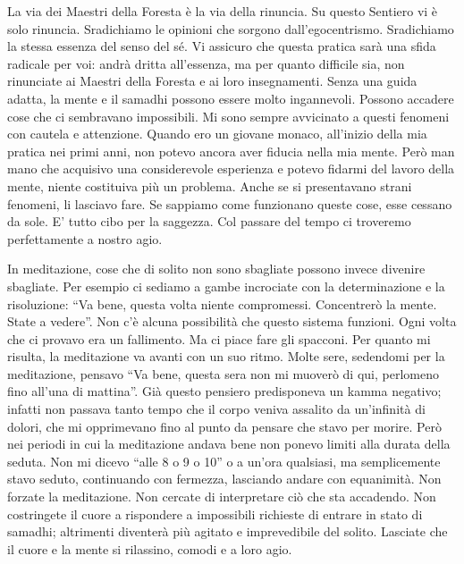La via dei Maestri della Foresta è la via della rinuncia. Su questo
Sentiero vi è solo rinuncia. Sradichiamo le opinioni che sorgono
dall'egocentrismo. Sradichiamo la stessa essenza del senso del sé. Vi
assicuro che questa pratica sarà una sfida radicale per voi: andrà
dritta all'essenza, ma per quanto difficile sia, non rinunciate ai
Maestri della Foresta e ai loro insegnamenti. Senza una guida adatta, la
mente e il samadhi possono essere molto ingannevoli. Possono accadere
cose che ci sembravano impossibili. Mi sono sempre avvicinato a questi
fenomeni con cautela e attenzione. Quando ero un giovane monaco,
all'inizio della mia pratica nei primi anni, non potevo ancora aver
fiducia nella mia mente. Però man mano che acquisivo una considerevole
esperienza e potevo fidarmi del lavoro della mente, niente costituiva
più un problema. Anche se si presentavano strani fenomeni, li lasciavo
fare. Se sappiamo come funzionano queste cose, esse cessano da sole. E'
tutto cibo per la saggezza. Col passare del tempo ci troveremo
perfettamente a nostro agio.

In meditazione, cose che di solito non sono sbagliate possono invece
divenire sbagliate. Per esempio ci sediamo a gambe incrociate con la
determinazione e la risoluzione: ``Va bene, questa volta niente
compromessi. Concentrerò la mente. State a vedere''. Non c'è alcuna
possibilità che questo sistema funzioni. Ogni volta che ci provavo era
un fallimento. Ma ci piace fare gli spacconi. Per quanto mi risulta, la
meditazione va avanti con un suo ritmo. Molte sere, sedendomi per la
meditazione, pensavo ``Va bene, questa sera non mi muoverò di qui,
perlomeno fino all'una di mattina''. Già questo pensiero predisponeva un
kamma negativo; infatti non passava tanto tempo che il corpo veniva
assalito da un'infinità di dolori, che mi opprimevano fino al punto da
pensare che stavo per morire. Però nei periodi in cui la meditazione
andava bene non ponevo limiti alla durata della seduta. Non mi dicevo
``alle 8 o 9 o 10'' o a un'ora qualsiasi, ma semplicemente stavo seduto,
continuando con fermezza, lasciando andare con equanimità. Non forzate
la meditazione. Non cercate di interpretare ciò che sta accadendo. Non
costringete il cuore a rispondere a impossibili richieste di entrare in
stato di samadhi; altrimenti diventerà più agitato e imprevedibile del
solito. Lasciate che il cuore e la mente si rilassino, comodi e a loro
agio.

